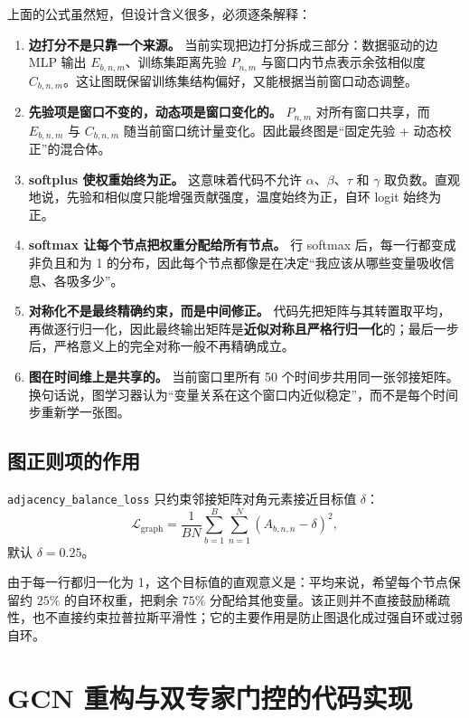 \documentclass[UTF8]{ctexart}
\begin{document}
上面的公式虽然短，但设计含义很多，必须逐条解释：
\begin{enumerate}
    \item \textbf{边打分不是只靠一个来源。} 当前实现把边打分拆成三部分：数据驱动的边 MLP 输出 \(E_{b,n,m}\)、训练集距离先验 \(P_{n,m}\) 与窗口内节点表示余弦相似度 \(C_{b,n,m}\)。这让图既保留训练集结构偏好，又能根据当前窗口动态调整。
    \item \textbf{先验项是窗口不变的，动态项是窗口变化的。} \(P_{n,m}\) 对所有窗口共享，而 \(E_{b,n,m}\) 与 \(C_{b,n,m}\) 随当前窗口统计量变化。因此最终图是“固定先验 + 动态校正”的混合体。
    \item \textbf{softplus 使权重始终为正。} 这意味着代码不允许 \(\alpha\)、\(\beta\)、\(\tau\) 和 \(\gamma\) 取负数。直观地说，先验和相似度只能增强贡献强度，温度始终为正，自环 logit 始终为正。
    \item \textbf{softmax 让每个节点把权重分配给所有节点。} 行 softmax 后，每一行都变成非负且和为 1 的分布，因此每个节点都像是在决定“我应该从哪些变量吸收信息、各吸多少”。
    \item \textbf{对称化不是最终精确约束，而是中间修正。} 代码先把矩阵与其转置取平均，再做逐行归一化，因此最终输出矩阵是\textbf{近似对称且严格行归一化}的；最后一步后，严格意义上的完全对称一般不再精确成立。
    \item \textbf{图在时间维上是共享的。} 当前窗口里所有 50 个时间步共用同一张邻接矩阵。换句话说，图学习器认为“变量关系在这个窗口内近似稳定”，而不是每个时间步重新学一张图。
 \end{enumerate}

\subsection{图正则项的作用}

\texttt{adjacency\_balance\_loss} 只约束邻接矩阵对角元素接近目标值 \(\delta\)：
\begin{equation}
    \mathcal{L}_{\text{graph}} =
    \frac{1}{BN}\sum_{b=1}^{B}\sum_{n=1}^{N}\left(A_{b,n,n} - \delta\right)^2,
\end{equation}
默认 \(\delta=0.25\)。

由于每一行都归一化为 1，这个目标值的直观意义是：平均来说，希望每个节点保留约 \(25\%\) 的自环权重，把剩余 \(75\%\) 分配给其他变量。该正则并不直接鼓励稀疏性，也不直接约束拉普拉斯平滑性；它的主要作用是防止图退化成过强自环或过弱自环。

\section{GCN 重构与双专家门控的代码实现}
\end{document}
